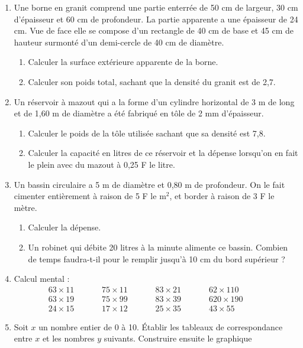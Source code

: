 \documentclass[12 pt]{report}
\theoremstyle{plain}
\newcounter{n}
\begin{document}
\begin{enumerate}
\item Une borne en granit comprend une partie enterrée de 50 cm de largeur, 30 cm d'épaisseur et 60 cm de 
profondeur. La partie apparente a une épaisseur de 24 cm. Vue de face elle se compose d'un rectangle de 40
cm de base et 45 cm de hauteur surmonté d'un demi-cercle de 40 cm de diamètre. \begin{enumerate}
\item Calculer la surface extérieure apparente de 
la borne. 
\item Calculer son poids total, sachant que la densité 
du granit est de 2,7. 
\end{enumerate}
\item Un réservoir à mazout qui a la forme d'un cylindre horizontal de 3 m de long et de 1,60 m de 
diamètre a été fabriqué en tôle de 2 mm d'épaisseur.
\begin{enumerate}
\item Calculer le poids de la tôle utilisée sachant que sa densité est 7,8. 
\item Calculer la capacité en litres de ce réservoir et la dépense lorsqu'on en fait le plein avec du 
mazout à 0,25 F le litre. 
\end{enumerate}
\item Un bassin circulaire a 5 m de diamètre et 0,80 m 
de profondeur. On le fait cimenter entièrement à raison de 5 F le m${}^2$, et border à raison de 3 F le
mètre.\begin{enumerate}
\item Calculer la dépense. 
\item Un robinet qui débite 20 litres à la minute 
alimente ce bassin. Combien de temps faudra-t-il pour le remplir jusqu'à 10 cm du bord supérieur ? 
\end{enumerate}
\item Calcul mental : 
\[\begin{matrix}
63 \times 11 \phantom{meow}& 75 \times 11\phantom{meow} & 83 \times 21\phantom{meow} & 62 \times
 110\phantom{meow} \\
 63 \times 19 \phantom{meow}& 75 \times 99 \phantom{meow}& 83 \times 39 \phantom{meow}& 620 \times 190\phantom{meow}\\
 24 \times 15 \phantom{meow}& 17 \times 12 \phantom{meow}& 25 \times 35 \phantom{meow}& 43 \times 55 \phantom{meow}
 \end{matrix}\]
 \item Soit $x$ un nombre entier de 0 à 10. Établir les tableaux de correspondance entre $x$ et les nombres $y$ suivants. Construire ensuite le graphique 

\end{enumerate}
\end{document}
